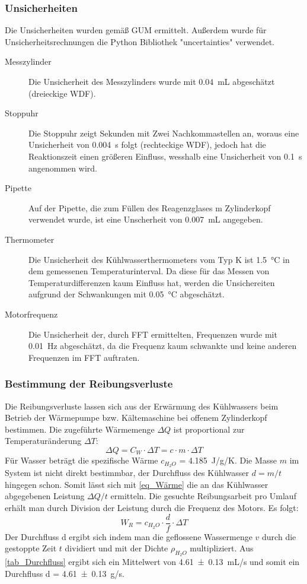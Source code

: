 \documentclass[
	a4paper,
	12pt,
	pagesize,
	ngerman
]{scrartcl}
\begin{document}
	\subsubsection{Unsicherheiten} 
	Die Unsicherheiten wurden gemäß GUM ermittelt. 
	Außerdem wurde für Unsicherheitsrechnungen die Python Bibliothek "uncertainties" verwendet.
	\begin{description}
		\item[Messzylinder] Die Unsicherheit des Messzylinders wurde mit \SI{0,04}{mL} abgeschätzt (dreieckige WDF).
		\item[Stoppuhr] Die Stoppuhr zeigt Sekunden mit Zwei Nachkommastellen an, woraus eine Unsicherheit von \SI{0,004}{s} folgt (rechteckige WDF), jedoch hat die Reaktionszeit einen größeren Einfluss, wesshalb eine Unsicherheit von \SI{0,1}{s} angenommen wird. 
		\item[Pipette] Auf der Pipette, die zum Füllen des Reagenzglases m Zylinderkopf verwendet wurde, ist eine Unscherheit von \SI{0,007}{mL} angegeben.
		\item[Thermometer] Die Unsicherheit des Kühlwasserthermometers vom Typ K ist \SI{1,5}{\degreeCelsius} in dem gemessenen Temperaturinterval. Da diese für das Messen von Temperaturdifferenzen kaum Einfluss hat, werden die Unsichereiten aufgrund der Schwankungen mit \SI{0,05}{\degreeCelsius} abgeschätzt.
		\item[Motorfrequenz] Die Unsicherheit der, durch FFT ermittelten, Frequenzen wurde mit \SI{0,01}{Hz} abgeschätzt, da die Frequenz kaum schwankte und keine anderen Frequenzen im FFT auftraten.
	
	\end{description}
	\subsubsection{Bestimmung der Reibungsverluste}
	Die Reibungsverluste lassen sich aus der Erwärmung des Kühlwassers beim Betrieb der Wärmepumpe bzw. Kältemaschine bei offenem Zylinderkopf bestimmen.
	Die zugeführte Wärmemenge $\Delta{Q}$ ist proportional zur Temperaturänderung $\Delta{T}$:
	\begin{equation}
	\Delta{Q} = C_W \cdot \Delta{T} = c \cdot m \cdot \Delta{T}
	\label{eq_Wärme}
	\end{equation} 
	Für Wasser beträgt die spezifische Wärme $c_{H_2O}$ = \SI{4,185}{J/g/K}.
	Die Masse $m$ im System ist nicht direkt bestimmbar, der Durchfluss des Kühlwasser $d=m/t$ hingegen schon. %
	Somit lässt sich mit \cref{eq_Wärme} die an das Kühlwasser abgegebenen Leistung $\Delta{Q}/t$ ermitteln.
	Die gesuchte Reibungsarbeit pro Umlauf erhält man durch Division der Leistung durch die Frequenz des Motors.
	Es folgt:
	\begin{equation}
	W_R = c_{H_2O} \cdot \frac{d}{f} \cdot \Delta{T}
	\label{eq_Reibungsarbeit}
	\end{equation}
	Der Durchfluss d ergibt sich indem man die geflossene Wassermenge $v$ durch die gestoppte Zeit $t$ dividiert und mit der Dichte $\rho_{H_2O}$ multipliziert. Aus \cref{tab_Durchfluss} ergibt sich ein Mittelwert von \SI{4,61+-0,13}{mL/s} und somit ein Durchfluss d = \SI{4,61+-0,13}{g/s}.
	
\end{document}
